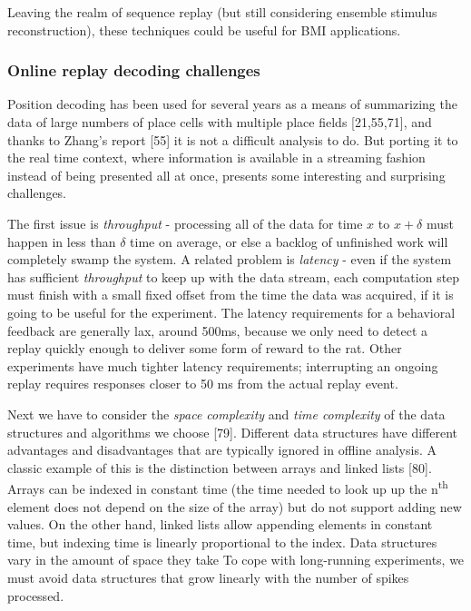 \documentclass[]{article}
\begin{document}
Leaving the realm of sequence replay (but still considering ensemble
stimulus reconstruction), these techniques could be useful for BMI
applications.

\subsubsection{Online replay decoding challenges}

Position decoding has been used for several years as a means of
summarizing the data of large numbers of place cells with multiple place
fields {[}21,55,71{]}, and thanks to Zhang's report {[}55{]} it is not a
difficult analysis to do. But porting it to the real time context, where
information is available in a streaming fashion instead of being
presented all at once, presents some interesting and surprising
challenges.

The first issue is \emph{throughput} - processing all of the data for
time \(x\) to \(x+\delta\) must happen in less than \(\delta\) time on
average, or else a backlog of unfinished work will completely swamp the
system. A related problem is \emph{latency} - even if the system has
sufficient \emph{throughput} to keep up with the data stream, each
computation step must finish with a small fixed offset from the time the
data was acquired, if it is going to be useful for the experiment. The
latency requirements for a behavioral feedback are generally lax, around
500ms, because we only need to detect a replay quickly enough to deliver
some form of reward to the rat. Other experiments have much tighter
latency requirements; interrupting an ongoing replay requires responses
closer to 50 ms from the actual replay event.

Next we have to consider the \emph{space complexity} and \emph{time
complexity} of the data structures and algorithms we choose {[}79{]}.
Different data structures have different advantages and disadvantages
that are typically ignored in offline analysis. A classic example of
this is the distinction between arrays and linked lists {[}80{]}. Arrays
can be indexed in constant time (the time needed to look up up the
n\textsuperscript{th} element does not depend on the size of the array)
but do not support adding new values. On the other hand, linked lists
allow appending elements in constant time, but indexing time is linearly
proportional to the index. Data structures vary in the amount of space
they take To cope with long-running experiments, we must avoid data
structures that grow linearly with the number of spikes processed.
\end{document}
